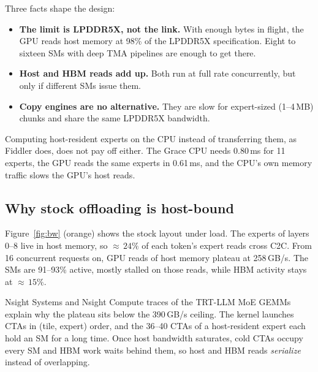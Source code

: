 \documentclass{article}
\newcommand{\figref}[1]{Figure~\ref{#1}}
\begin{document}
Three facts shape the design:
\begin{itemize}
  \item \textbf{The limit is LPDDR5X, not the link.} With enough bytes in flight, the GPU reads host memory at 98\% of
        the LPDDR5X specification. Eight to sixteen SMs with deep TMA pipelines are enough to get there.
  \item \textbf{Host and HBM reads add up.} Both run at full rate concurrently, but only if different SMs issue them.
  \item \textbf{Copy engines are no alternative.} They are slow for expert-sized (1--4\,MB) chunks and share the same
        LPDDR5X bandwidth.
\end{itemize}
Computing host-resident experts on the CPU instead of transferring them, as Fiddler \citep{fiddler} does, does not pay
off either. The Grace CPU needs 0.80\,ms for 11 experts, the GPU reads the same experts in 0.61\,ms, and the CPU's own
memory traffic slows the GPU's host reads.

\subsection{Why stock offloading is host-bound}
\figref{fig:bw} (orange) shows the stock layout under load. The experts of layers 0--8 live in host memory, so
${\approx}\,24\%$ of each token's expert reads cross C2C. From 16 concurrent requests on, GPU reads of host memory
plateau at 258\,GB/s. The SMs are 91--93\% active, mostly stalled on those reads, while HBM activity stays at
${\approx}\,15\%$.

Nsight Systems and Nsight Compute traces of the TRT-LLM MoE GEMMs explain why the plateau sits below the 390\,GB/s
ceiling. The kernel launches CTAs in (tile, expert) order, and the 36--40 CTAs of a host-resident expert each hold an SM
for a long time. Once host bandwidth saturates, cold CTAs occupy every SM and HBM work waits behind them, so host and
HBM reads \emph{serialize} instead of overlapping.
\end{document}
